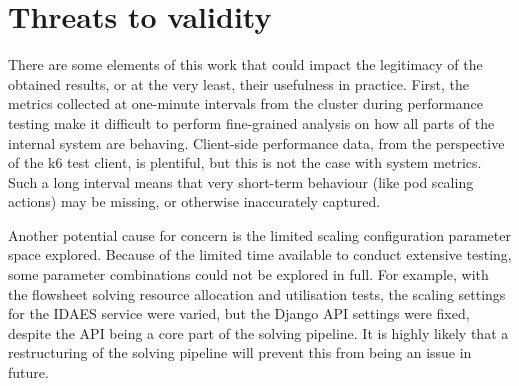 \section{Threats to validity}

There are some elements of this work that could impact the legitimacy of the obtained results, or at the very least, their usefulness in practice. First, the metrics collected at one-minute intervals from the cluster during performance testing make it difficult to perform fine-grained analysis on how all parts of the internal system are behaving. Client-side performance data, from the perspective of the k6 test client, is plentiful, but this is not the case with system metrics. Such a long interval means that very short-term behaviour (like pod scaling actions) may be missing, or otherwise inaccurately captured.

Another potential cause for concern is the limited scaling configuration parameter space explored. Because of the limited time available to conduct extensive testing, some parameter combinations could not be explored in full. For example, with the flowsheet solving resource allocation and utilisation tests, the scaling settings for the IDAES service were varied, but the Django API settings were fixed, despite the API being a core part of the solving pipeline. It is highly likely that a restructuring of the solving pipeline will prevent this from being an issue in future.